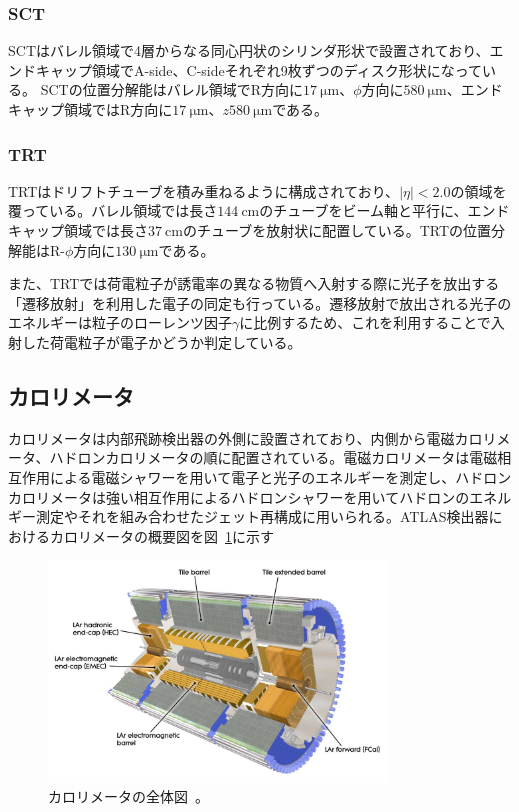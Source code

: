 \subsubsection{SCT}
SCTはバレル領域で4層からなる同心円状のシリンダ形状で設置されており、エンドキャップ領域でA-side、C-sideそれぞれ9枚ずつのディスク形状になっている。
SCTの位置分解能はバレル領域でR方向に$\SI{17}{\um}$、$\phi$方向に$\SI{580}{\um}$、エンドキャップ領域ではR方向に$\SI{17}{\um}$、$z$$\SI{580}{\um}$である。


\subsubsection{TRT}
TRTはドリフトチューブを積み重ねるように構成されており、$|\eta|<2.0$の領域を覆っている。バレル領域では長さ$\SI{144}{\cm}$のチューブをビーム軸と平行に、エンドキャップ領域では長さ$\SI{37}{\cm}$のチューブを放射状に配置している。TRTの位置分解能はR-$\phi$方向に$\SI{130}{\um}$である。

また、TRTでは荷電粒子が誘電率の異なる物質へ入射する際に光子を放出する「遷移放射」を利用した電子の同定も行っている。遷移放射で放出される光子のエネルギーは粒子のローレンツ因子$\gamma$に比例するため、これを利用することで入射した荷電粒子が電子かどうか判定している。

\subsection{カロリメータ}\label{2-2-4}
カロリメータは内部飛跡検出器の外側に設置されており、内側から電磁カロリメータ、ハドロンカロリメータの順に配置されている。電磁カロリメータは電磁相互作用による電磁シャワーを用いて電子と光子のエネルギーを測定し、ハドロンカロリメータは強い相互作用によるハドロンシャワーを用いてハドロンのエネルギー測定やそれを組み合わせたジェット再構成に用いられる。ATLAS検出器におけるカロリメータの概要図を図~\ref{fig:2-10}に示す

\begin{figure}[h]
  \centering
  \includegraphics[clip, width=9cm]{fig/2/Calorimeter_d3.pdf}
  \caption{カロリメータの全体図~\cite{Aad:1129811}。}
  \label{fig:2-10}
\end{figure}

